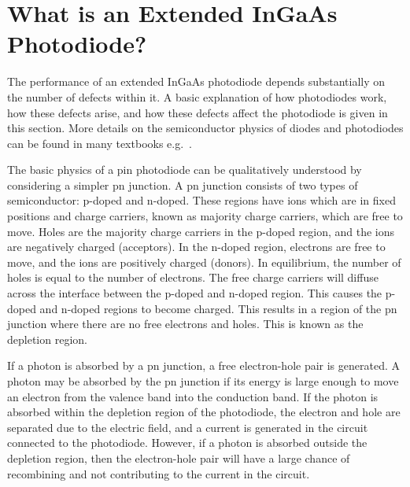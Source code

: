 \section{What is an Extended InGaAs Photodiode?}
\label{sec:pd_chapter_diode_intro}
The performance of an extended InGaAs photodiode depends substantially on the number of defects within it. A basic explanation of how photodiodes work, how these defects arise, and how these defects affect the photodiode is given in this section. More details on the semiconductor physics of diodes and photodiodes can be found in many textbooks e.g.~\cite{Grundmann2010,Protopopov2014}.
\par
The basic physics of a \gls{pin} photodiode can be qualitatively understood by considering a simpler pn junction. A pn junction consists of two types of semiconductor: p-doped and n-doped. These regions have ions which are in fixed positions and charge carriers, known as majority charge carriers, which are free to move. Holes are the majority charge carriers in the p-doped region, and the ions are negatively charged (acceptors). In the n-doped region, electrons are free to move, and the ions are positively charged (donors). In equilibrium, the number of holes is equal to the number of electrons. The free charge carriers will diffuse across the interface between the p-doped and n-doped region. This causes the p-doped and n-doped regions to become charged. This results in a region of the pn junction where there are no free electrons and holes. This is known as the depletion region.
\par
If a photon is absorbed by a pn junction, a free electron-hole pair is generated. A photon may be absorbed by the pn junction if its energy is large enough to move an electron from the valence band into the conduction band. If the photon is absorbed within the depletion region of the photodiode, the electron and hole are separated due to the electric field, and a current is generated in the circuit connected to the photodiode. However, if a photon is absorbed outside the depletion region, then the electron-hole pair will have a large chance of recombining and not contributing to the current in the circuit.
